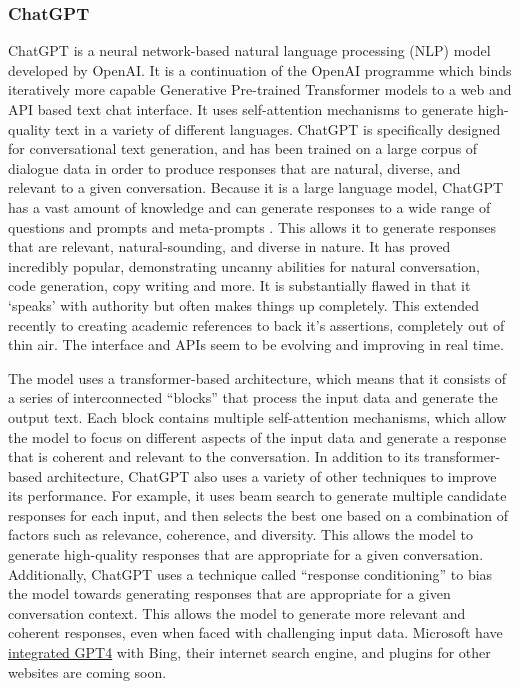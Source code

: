 \subsubsection{ChatGPT}
ChatGPT is a neural network-based natural language processing (NLP) model developed by OpenAI. It is a continuation of the OpenAI programme which binds iteratively more capable Generative Pre-trained Transformer models to a web and API based text chat interface. It uses self-attention mechanisms to generate high-quality text in a variety of different languages. ChatGPT is specifically designed for conversational text generation, and has been trained on a large corpus of dialogue data in order to produce responses that are natural, diverse, and relevant to a given conversation. Because it is a large language model, ChatGPT has a vast amount of knowledge and can generate responses to a wide range of questions and prompts and meta-prompts \cite{hou2022metaprompting}. This allows it to generate responses that are relevant, natural-sounding, and diverse in nature. It has proved incredibly popular, demonstrating uncanny abilities for natural conversation, code generation, copy writing and more. It is substantially flawed in that it `speaks' with authority but often makes things up completely. This extended recently to creating academic references to back it's assertions, completely out of thin air. The interface and APIs seem to be evolving and improving in real time.\par
The model uses a transformer-based architecture, which means that it consists of a series of interconnected ``blocks'' that process the input data and generate the output text. Each block contains multiple self-attention mechanisms, which allow the model to focus on different aspects of the input data and generate a response that is coherent and relevant to the conversation. In addition to its transformer-based architecture, ChatGPT also uses a variety of other techniques to improve its performance. For example, it uses beam search to generate multiple candidate responses for each input, and then selects the best one based on a combination of factors such as relevance, coherence, and diversity. This allows the model to generate high-quality responses that are appropriate for a given conversation. Additionally, ChatGPT uses a technique called ``response conditioning'' to bias the model towards generating responses that are appropriate for a given conversation context. This allows the model to generate more relevant and coherent responses, even when faced with challenging input data. Microsoft have  \href{https://medium.com/@owenyin/scoop-oh-the-things-youll-do-with-bing-s-chatgpt-62b42d8d7198}{integrated GPT4} with Bing, their internet search engine, and plugins for other websites are coming soon.\par 
